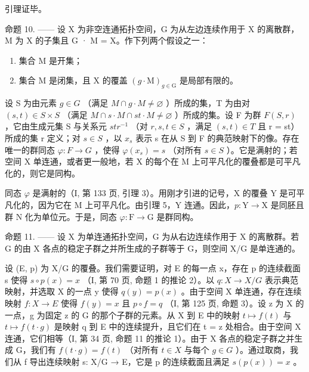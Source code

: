 引理证毕。

命题 10. —— 设 X 为非空连通拓扑空间，G 为从左边连续作用于 X 的离散群，M 为 X 的子集且 G · M = X。作下列两个假设之一：

\begin{enumerate}
\def\labelenumi{(\roman{enumi})}
\item
  集合 M 是开集；
\item
  集合 M 是闭集，且 X 的覆盖 \((g \cdot \mathrm{M})_{g \in \mathrm{G}}\) 是局部有限的。
\end{enumerate}

设 S 为由元素 \(g \in G\) （满足 \(M \cap g \cdot M \neq \varnothing\) ）所成的集，T 为由对 \((s, t) \in S \times S\) （满足 \(M \cap s \cdot M \cap st \cdot M \neq \varnothing\) ）所成的集。设 F 为群 \(F(S, r)\) ，它由生成元集 S 与关系元 \(str^{-1}\) （对 \(r, s, t \in S\) ，满足 \((s, t) \in T\) 且 r = st）所成的集 r 定义；对 \(s \in S\) ，以 \(x_s\) 表示 s 在从 S 到 F 的典范映射下的像。存在唯一的群同态 \(\varphi: F \to G\) ，使得 \(\varphi(x_s) = s\) （对所有 \(s \in S\) ）。它是满射的；若空间 X 单连通，或者更一般地，若 X 的每个在 M 上可平凡化的覆叠都是可平凡化的，则它是同构。

同态 \(\varphi\) 是满射的（I, 第 133 页, 引理 3）。用刚才引进的记号，X 的覆叠 Y 是可平凡化的，因为它在 M 上可平凡化。由引理 5，Y 连通。因此，\(p\colon\mathrm{Y}\to\mathrm{X}\) 是同胚且群 N 化为单位元。于是，同态 \(\varphi\colon\mathrm{F}\to\mathrm{G}\) 是群同构。

命题 11. —— 设 X 为单连通拓扑空间，G 为从右边连续作用于 X 的离散群。若 G 的由 X 各点的稳定子群之并所生成的子群等于 G，则空间 X/G 是单连通的。

设 (E, p) 为 X/G 的覆叠。我们需要证明，对 E 的每一点 x，存在 p 的连续截面 s 使得 \(s \circ p(x) = x\) （I, 第 70 页, 命题 1 的推论 2）。以 \(q: X \to X/G\) 表示典范映射，并选取 X 的一点 y 使得 \(q(y) = p(x)\) 。由于空间 X 单连通，存在连续映射 \(f: X \to E\) 使得 \(f(y) = x\) 且 \(p \circ f = q\) （I, 第 125 页, 命题 3）。设 z 为 X 的一点，g 为固定 z 的 G 的那个子群的元素。从 X 到 E 中的映射 \(t \mapsto f(t)\) 与 \(t \mapsto f(t \cdot g)\) 是映射 q 到 E 中的连续提升，且它们在 t = z 处相合。由于空间 X 连通，它们相等（I, 第 34 页, 命题 11 的推论 1）。由于 X 各点的稳定子群之并生成 G，我们有 \(f(t \cdot g) = f(t)\) （对所有 \(t \in X\) 与每个 \(g \in G\) ）。通过取商，我们从 f 导出连续映射 s: X/G → E，它是 p 的连续截面且满足 \(s(p(x)) = x\) 。

